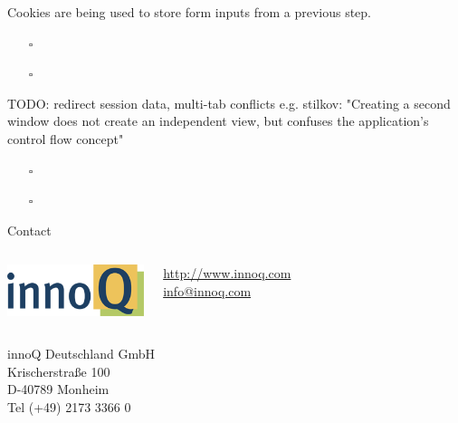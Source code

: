 \documentclass{beamer}
\begin{document}
\begin{frame}
  Cookies are being used to store form inputs from a previous step.

  \vspace{0.3cm}
  \begin{itemize}
    \item[$\square$] 
    \item[$\square$] 
  \end{itemize}

\end{frame}

\begin{frame}
  TODO: redirect session data, multi-tab conflicts
  e.g. stilkov: "Creating a second window does not create an independent view, but confuses the application's control flow concept"

  \vspace{0.3cm}
  \begin{itemize}
    \item[$\square$] 
    \item[$\square$] 
  \end{itemize}

\end{frame}

\begin{frame}{Contact}
  \begin{columns}
    \column{5cm}
    \includegraphics[width=4cm]{images/innoQ-Logo-RGB-72dpi.png}
    \vspace{4mm}
    \column{4.5cm}

    \href{http://www.innoq.com}{http://www.innoq.com} \\
    \href{mailto:info@innoq.com}{info@innoq.com}
  \end{columns}

  innoQ Deutschland GmbH \\
  Krischerstraße 100 \\
  D-40789 Monheim \\
  Tel (+49) 2173 3366 0
\end{frame}
\end{document}

